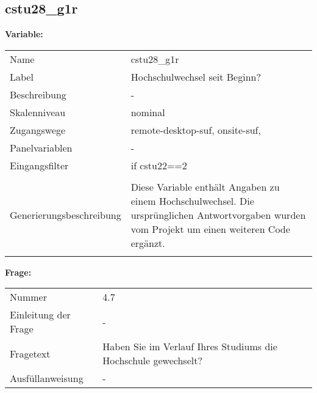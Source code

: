 	
	
	\subsection{cstu28\_g1r}
	\label{subSection:cstu28_g1r}

	\noindent\textbf{Variable:}\\
		\begin{tabular}{lL{11.3cm}}
			\label{tableVariable:cstu28_g1r}
			Name & cstu28\_g1r \\
			Label & Hochschulwechsel seit Beginn? \\
			Beschreibung & - \\
			Skalenniveau & nominal \\
			Zugangswege &
				remote-desktop-suf,
				onsite-suf,
 \\
			Panelvariablen & -
			 \\
			Eingangsfilter & if cstu22==2 \\
 \\
					Generierungsbeschreibung & Diese Variable enthält Angaben zu einem Hochschulwechsel. Die ursprünglichen Antwortvorgaben wurden vom Projekt um einen weiteren Code ergänzt. 
				 \\	
			 \\
		\end{tabular}

		\vspace*{1 cm}
		\noindent\textbf{Frage:}\\
		\begin{tabular}{lL{11.3cm}}
			\label{tableQuestion:cstu28_g1r}
			Nummer & 4.7 \\
			Einleitung der Frage & - \\
			Fragetext & Haben Sie im Verlauf Ihres Studiums die Hochschule gewechselt? \\
			Ausfüllanweisung & - \\
		\end{tabular}





